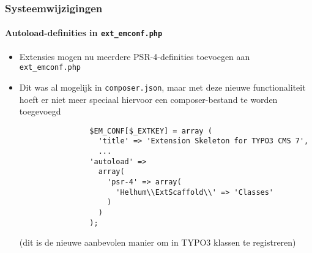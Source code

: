 \begin{frame}[fragile]
	\frametitle{Systeemwijzigingen}
	\framesubtitle{Autoload-definities in \texttt{ext\_emconf.php}}

	\lstset{basicstyle=\tiny\ttfamily}

	\begin{itemize}

		\item Extensies mogen nu meerdere PSR-4-definities toevoegen aan \texttt{ext\_emconf.php}

		\item Dit was al mogelijk in \texttt{composer.json}, maar met deze nieuwe functionaliteit
			hoeft er niet meer speciaal hiervoor een composer-bestand te worden toegevoegd

			\begin{lstlisting}
				$EM_CONF[$_EXTKEY] = array (
				  'title' => 'Extension Skeleton for TYPO3 CMS 7',
				  ...
				'autoload' =>
				  array(
				    'psr-4' => array(
				      'Helhum\\ExtScaffold\\' => 'Classes'
				    )
				  )
				);
			\end{lstlisting}

			\small
				(dit is de nieuwe aanbevolen manier om in TYPO3 klassen te registreren)
			\normalsize

	\end{itemize}

\end{frame}


